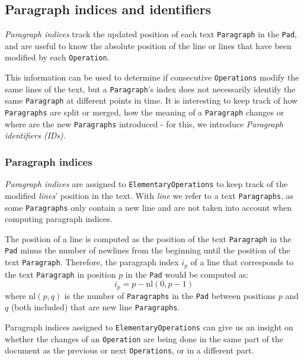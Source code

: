   \subsection{Paragraph indices and identifiers}
    \label{sub:para_ids}
    \textit{Paragraph indices} track the updated position of each text \texttt{Paragraph} in the \texttt{Pad}, and are useful to know the absolute position of the line or lines that have been modified by each \texttt{Operation}. 
    
    This information can be used to determine if consecutive \texttt{Operations} modify the same lines of the text, but a \texttt{Paragraph}'s index does not necessarily identify the same \texttt{Paragraph} at different points in time. It is interesting to keep track of how \texttt{Paragraphs} are split or merged, how the meaning of a \texttt{Paragraph} changes or where are the new \texttt{Paragraphs} introduced - for this, we introduce \textit{Paragraph identifiers (IDs)}.
    
    \subsubsection{Paragraph indices}
      \textit{Paragraph indices} are assigned to \texttt{ElementaryOperations} to keep track of the modified \textit{lines}' position in the text. With \textit{line} we refer to a text \texttt{Paragraphs}, as some \texttt{Paragraphs} only contain a new line and are not taken into account when computing paragraph indices.
      
      The position of a line is computed as the position of the text \texttt{Paragraph} in the \texttt{Pad} minus the number of newlines from the beginning until the position of the text \texttt{Paragraph}. Therefore, the paragraph index $i_p$ of a line that corresponds to the text \texttt{Paragraph} in position $p$ in the \texttt{Pad} would be computed as:
      \begin{equation}\label{eq:paraindex}
               i_p = p-\text{nl}(0,p-1)
      \end{equation}
      where nl$(p,q)$ is the number of \texttt{Paragraphs} in the \texttt{Pad} between positions $p$ and $q$ (both included) that are new line \texttt{Paragraphs}.
      
      Paragraph indices assigned to \texttt{ElementaryOperations} can give us an insight on whether the changes of an \texttt{Operation} are being done in the same part of the document as the previous or next \texttt{Operations}, or in a different part.
      
